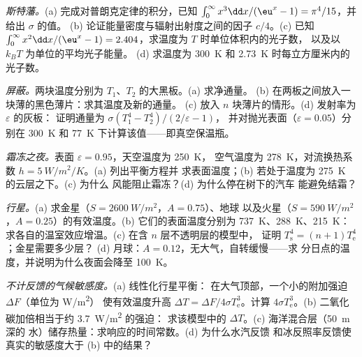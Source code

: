 \begin{exercise}[$\star\star$]\label{exo:b2:thermal-radiation:7}
\emph{斯特藩。}(a) 完成对普朗克定律的积分，已知
$\int_0^\infty x^3\dd x/(\eu^x - 1) = \pi^4/15$，并给出 $\sigma$ 的值。
(b) 论证能量密度与辐射出射度之间的因子 $c/4$。(c) 已知
$\int_0^\infty x^2\dd x/(\eu^x - 1) = 2.404$，求温度为 $T$ 时单位体积内的光子数，
以及以 $k_BT$ 为单位的平均光子能量。
(d) 求温度为 \qty{300}{K} 和 \qty{2.73}{K} 时每立方厘米内的光子数。
\end{exercise}

\begin{exercise}[$\star\star$]\label{exo:b2:thermal-radiation:8}
\emph{屏蔽。}两块温度分别为 $T_1$、$T_2$ 的大黑板。(a) 求净通量。
(b) 在两板之间放入一块薄的黑色薄片：求其温度及新的通量。
(c) 放入 $n$ 块薄片的情形。(d) 发射率为 $\varepsilon$ 的灰板：
证明通量为 $\sigma(T_1^4 - T_2^4)/(2/\varepsilon - 1)$，
并对抛光表面（$\varepsilon = 0.05$）分别在 \qty{300}{K} 和
\qty{77}{K} 下计算该值——即真空保温瓶。
\end{exercise}

\begin{exercise}[$\star\star$]\label{exo:b2:thermal-radiation:9}
\emph{霜冻之夜。}表面 $\varepsilon = 0.95$，天空温度为 \qty{250}{K}，
空气温度为 \qty{278}{K}，对流换热系数 $h = \qty{5}{W/m^2/K}$。(a) 列出平衡方程并
求表面温度；(b) 若处于温度为 \qty{275}{K} 的云层之下。(c) 为什么
风能阻止霜冻？(d) 为什么停在树下的汽车
能避免结霜？
\end{exercise}

\begin{exercise}[$\star\star\star$]\label{exo:b2:thermal-radiation:10}
\emph{行星。}(a) 求金星（$S = \qty{2600}{W/m^2}$，$A = 0.75$）、地球
以及火星（$S = \qty{590}{W/m^2}$，$A = 0.25$）的有效温度。(b) 它们的表面温度分别为
\qty{737}{K}、\qty{288}{K}、\qty{215}{K}：
求各自的温室效应增温。(c) 在含 $n$ 层不透明层的模型中，
证明 $T_{\text{s}}^4 = (n + 1)T_{\text{e}}^4$；金星需要多少层？
(d) 月球：$A = 0.12$，无大气，自转缓慢——求
分日点的温度，并说明为什么夜面会降至 \qty{100}{K}。
\end{exercise}

\begin{exercise}[$\star\star\star$]\label{exo:b2:thermal-radiation:11}
\emph{不计反馈的气候敏感度。}(a) 线性化行星平衡：
在大气顶部，一个小的附加强迫 $\Delta F$（单位为 \unit{W/m^2}）
使有效温度升高 $\Delta T
= \Delta F/4\sigma T_{\text{e}}^3$。计算 $4\sigma T_{\text{e}}^3$。(b)
二氧化碳加倍相当于约 \qty{3.7}{W/m^2} 的强迫：
求该模型中的 $\Delta T$。(c) 海洋混合层（\qty{50}{m} 深的
水）储存热量：求响应的时间常数。(d) 为什么水汽反馈
和冰反照率反馈使真实的敏感度大于
(b) 中的结果？
\end{exercise}


